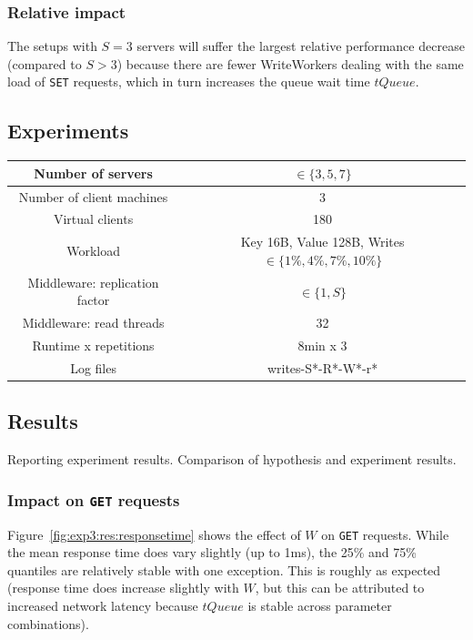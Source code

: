 \documentclass[11pt]{article}
\newcommand{\get}[0]{\texttt{GET}}
\newcommand{\set}[0]{\texttt{SET}}
\begin{document}
\subsubsection{Relative impact}
The setups with $S=3$ servers will suffer the largest relative performance decrease (compared to $S > 3$) because there are fewer WriteWorkers dealing with the same load of \set{} requests, which in turn increases the queue wait time $tQueue$.

\subsection{Experiments}
\begin{center}
\small{
\smallskip
\begin{tabular}{|c|c|}
\hline Number of servers & $\in \{3, 5, 7\}$ \\ 
\hline Number of client machines & 3 \\ 
\hline Virtual clients & 180 \\ 
\hline Workload & Key 16B, Value 128B, Writes $\in \{1\%, 4\%, 7\%, 10\%\}$ \\
\hline Middleware: replication factor & $\in \{1, S\}$ \\ 
\hline Middleware: read threads & 32 \\ 
\hline Runtime x repetitions & 8min x 3 \\ 
\hline Log files & writes-S*-R*-W*-r* \\
\hline 
\end{tabular} }
\end{center}

\subsection{Results}
Reporting experiment results. Comparison of hypothesis and experiment results.

\subsubsection{Impact on \get{} requests}

Figure~\ref{fig:exp3:res:responsetime} shows the effect of $W$ on \get{} requests. While the mean response time does vary slightly (up to 1ms), the 25\% and 75\% quantiles are relatively stable with one exception. This is roughly as expected (response time does increase slightly with $W$, but this can be attributed to increased network latency because $tQueue$ is stable across parameter combinations).
\end{document}
